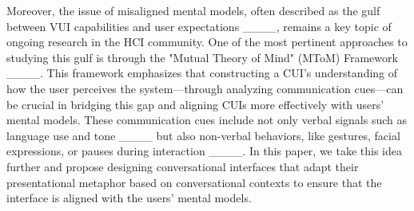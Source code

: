 Moreover, the issue of misaligned mental models, often described as the gulf between VUI capabilities and user expectations ____, remains a key topic of ongoing research in the HCI community. One of the most pertinent approaches to studying this gulf is through the "Mutual Theory of Mind" (MToM) Framework ____. This framework emphasizes that constructing a CUI’s understanding of how the user perceives the system—through analyzing communication cues—can be crucial in bridging this gap and aligning CUIs more effectively with users' mental models. These communication cues include not only verbal signals such as language use and tone ____ but also non-verbal behaviors, like gestures, facial expressions, or pauses during interaction ____. In this paper, we take this idea further and propose designing conversational interfaces that adapt their presentational metaphor based on conversational contexts to ensure that the interface is aligned with the users' mental models.